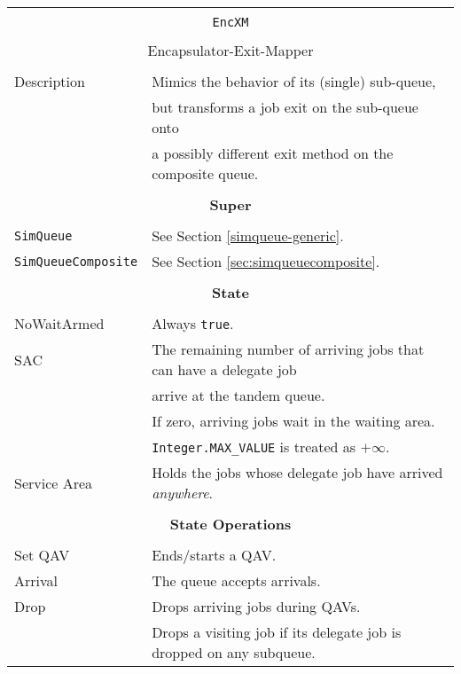 \begin{tabular}{|l|l|}
	\hline
	\multicolumn{2}{|c|}{} \\
	\multicolumn{2}{|c|}{\lstinline[basicstyle=\large]{EncXM}} \\
	\multicolumn{2}{|c|}{} \\
	\multicolumn{2}{|c|}{Encapsulator-Exit-Mapper} \\
	\multicolumn{2}{|c|}{} \\
	\hline
	Description & Mimics the behavior of its (single) sub-queue, \\
	& but transforms a job exit on the sub-queue onto \\
	& a possibly different exit method on the composite queue.\\
	\hline
	\multicolumn{2}{|c|}{} \\
	\multicolumn{2}{|c|}{\bf Super} \\
	\multicolumn{2}{|c|}{} \\
	\hline
	\lstinline|SimQueue| & See Section \ref{simqueue-generic}. \\
	\lstinline|SimQueueComposite| & See Section \ref{sec:simqueuecomposite}. \\
	\hline
	\multicolumn{2}{|c|}{} \\
	\multicolumn{2}{|c|}{\bf State} \\
	\multicolumn{2}{|c|}{} \\
	\hline
	NoWaitArmed & Always \lstinline|true|. \\
	\hline
	SAC & The remaining number of arriving jobs that can have a delegate job \\
	& arrive at the tandem queue. \\
	& If zero, arriving jobs wait in the waiting area. \\
	& \lstinline|Integer.MAX_VALUE| is treated as $+\infty$. \\
	\hline
	Service Area & Holds the jobs whose delegate job have arrived {\em anywhere}. \\
	\hline
	\multicolumn{2}{|c|}{} \\
	\multicolumn{2}{|c|}{\bf State Operations} \\
	\multicolumn{2}{|c|}{} \\
	\hline
	Set QAV & Ends/starts a QAV. \\
	\hline
	Arrival & The queue accepts arrivals. \\
	\hline
	Drop & Drops arriving jobs during QAVs. \\
	& Drops a visiting job if its delegate job is dropped on any subqueue. \\

\end{tabular}
